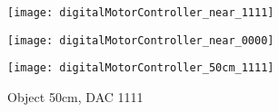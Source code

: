 \begin{figure}[!htb]
    \centering
    \begin{minipage}{.45\textwidth}
        \centering
        \texttt{[image: digitalMotorController\_near\_1111]}
        \label{fig:digitalMotorController_near_1111}
    \end{minipage}
    \begin{minipage}{.45\textwidth}
        \centering
        \texttt{[image: digitalMotorController\_near\_0000]}
        \label{fig:digitalMotorController_near_0000}
    \end{minipage}
\end{figure}

\begin{figure}[!htb]
  \centering
  \texttt{[image: digitalMotorController\_50cm\_1111]}
  \caption{Object 50cm, DAC 1111}
  \label{fig:digitalMotorController_50cm_1111}
\end{figure}